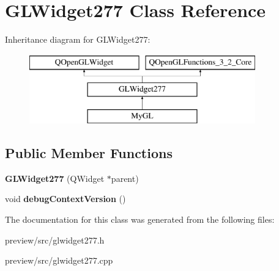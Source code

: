 \hypertarget{class_g_l_widget277}{}\section{G\+L\+Widget277 Class Reference}
\label{class_g_l_widget277}
Inheritance diagram for G\+L\+Widget277\+:\begin{figure}[H]
\begin{center}
\leavevmode
\includegraphics[height=3.000000cm]{class_g_l_widget277}
\end{center}
\end{figure}
\subsection*{Public Member Functions}
\begin{DoxyCompactItemize}
\item 
\hypertarget{class_g_l_widget277_a176b0f695ef85f4c9c77ef0539e307ac}{}{\bfseries G\+L\+Widget277} (Q\+Widget $\ast$parent)\label{class_g_l_widget277_a176b0f695ef85f4c9c77ef0539e307ac}

\item 
\hypertarget{class_g_l_widget277_a2857e8eeef7d84469d423b9363b4f42b}{}void {\bfseries debug\+Context\+Version} ()\label{class_g_l_widget277_a2857e8eeef7d84469d423b9363b4f42b}

\end{DoxyCompactItemize}


The documentation for this class was generated from the following files\+:\begin{DoxyCompactItemize}
\item 
preview/src/glwidget277.\+h\item 
preview/src/glwidget277.\+cpp\end{DoxyCompactItemize}

